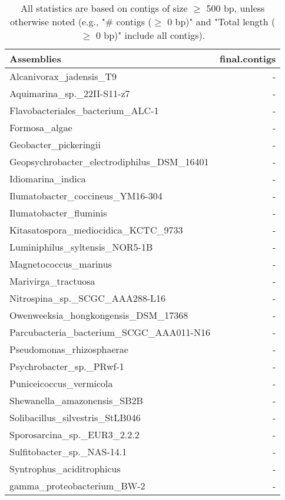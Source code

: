 \documentclass[12pt,a4paper]{article}
\begin{document}
\begin{table}[ht]
\begin{center}
\caption{All statistics are based on contigs of size $\geq$ 500 bp, unless otherwise noted (e.g., "\# contigs ($\geq$ 0 bp)" and "Total length ($\geq$ 0 bp)" include all contigs).}
\begin{tabular}{|l*{1}{|r}|}
\hline
Assemblies & final.contigs \\ \hline
Alcanivorax\_jadensis\_T9 & - \\ \hline
Aquimarina\_sp.\_22II-S11-z7 & - \\ \hline
Flavobacteriales\_bacterium\_ALC-1 & - \\ \hline
Formosa\_algae & - \\ \hline
Geobacter\_pickeringii & - \\ \hline
Geopsychrobacter\_electrodiphilus\_DSM\_16401 & - \\ \hline
Idiomarina\_indica & - \\ \hline
Ilumatobacter\_coccineus\_YM16-304 & - \\ \hline
Ilumatobacter\_fluminis & - \\ \hline
Kitasatospora\_mediocidica\_KCTC\_9733 & - \\ \hline
Luminiphilus\_syltensis\_NOR5-1B & - \\ \hline
Magnetococcus\_marinus & - \\ \hline
Marivirga\_tractuosa & - \\ \hline
Nitrospina\_sp.\_SCGC\_AAA288-L16 & - \\ \hline
Owenweeksia\_hongkongensis\_DSM\_17368 & - \\ \hline
Parcubacteria\_bacterium\_SCGC\_AAA011-N16 & - \\ \hline
Pseudomonas\_rhizosphaerae & - \\ \hline
Psychrobacter\_sp.\_PRwf-1 & - \\ \hline
Puniceicoccus\_vermicola & - \\ \hline
Shewanella\_amazonensis\_SB2B & - \\ \hline
Solibacillus\_silvestris\_StLB046 & - \\ \hline
Sporosarcina\_sp.\_EUR3\_2.2.2 & - \\ \hline
Sulfitobacter\_sp.\_NAS-14.1 & - \\ \hline
Syntrophus\_aciditrophicus & - \\ \hline
gamma\_proteobacterium\_BW-2 & - \\ \hline
\end{tabular}
\end{center}
\end{table}
\end{document}
